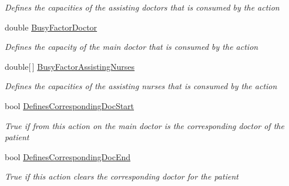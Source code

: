 \begin{DoxyCompactItemize}
\begin{DoxyCompactList}\small\item\em Defines the capacities of the assisting doctors that is consumed by the action \end{DoxyCompactList}\item 
double \hyperlink{class_general_health_care_elements_1_1_general_classes_1_1_action_types_and_paths_1_1_action_type_class_a9956b8f439b37d7c5d7526698fae50dc}{Busy\+Factor\+Doctor}
\begin{DoxyCompactList}\small\item\em Defines the capacity of the main doctor that is consumed by the action \end{DoxyCompactList}\item 
double\mbox{[}$\,$\mbox{]} \hyperlink{class_general_health_care_elements_1_1_general_classes_1_1_action_types_and_paths_1_1_action_type_class_ac9f50c2c1becb75fe905f1957c47b264}{Busy\+Factor\+Assisting\+Nurses}
\begin{DoxyCompactList}\small\item\em Defines the capacities of the assisting nurses that is consumed by the action \end{DoxyCompactList}\item 
bool \hyperlink{class_general_health_care_elements_1_1_general_classes_1_1_action_types_and_paths_1_1_action_type_class_a4eded72d6bffeefce57e011a68ce097d}{Defines\+Corresponding\+Doc\+Start}
\begin{DoxyCompactList}\small\item\em True if from this action on the main doctor is the corresponding doctor of the patient \end{DoxyCompactList}\item 
bool \hyperlink{class_general_health_care_elements_1_1_general_classes_1_1_action_types_and_paths_1_1_action_type_class_a055efed3f0801d793b51baee7d10d90a}{Defines\+Corresponding\+Doc\+End}
\begin{DoxyCompactList}\small\item\em True if this action clears the corresponding doctor for the patient \end{DoxyCompactList}\item 

\end{DoxyCompactItemize}
